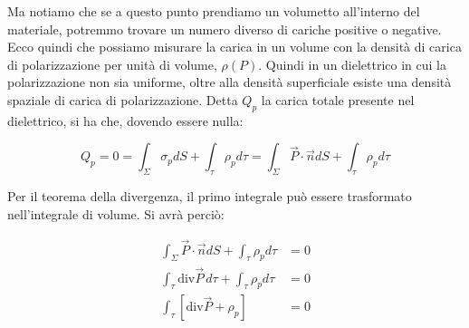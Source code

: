 \begin{figure}[htpb]
\end{figure}
\FloatBarrier

Ma notiamo che se a questo punto prendiamo un volumetto all'interno del materiale, potremmo trovare un numero diverso di cariche positive o negative. Ecco quindi che possiamo misurare la carica in un volume con la densità di carica di polarizzazione per unità di volume, $ \rho (P) $. Quindi in un dielettrico in cui la polarizzazione non sia uniforme, oltre alla densità superficiale esiste una densità spaziale di carica di polarizzazione.
Detta $Q_p$ la carica totale presente nel dielettrico, si ha che, dovendo essere nulla:

\[
	Q_p = 0 = \int_{\Sigma}\sigma_pdS + \int_{\tau} \rho_pd\tau = \int_{\Sigma}\vec{P} \cdot \vec{n} dS + \int_{\tau} \rho_p d\tau
\]

Per il teorema della divergenza, il primo integrale può essere trasformato
nell'integrale di volume. Si avrà perciò:

\begin{align*}
	\int_{\Sigma}\vec{P} \cdot \vec{n} dS + \int_{\tau} \rho_p d\tau &= 0 \\
	\int_{\tau}\text{div}\vec{P} \, d\tau + \int_{\tau} \rho_p d\tau &= 0 \\
	\int_{\tau} \left[ \text{div}\vec{P} + \rho_p  \right] &= 0
\end{align*}

